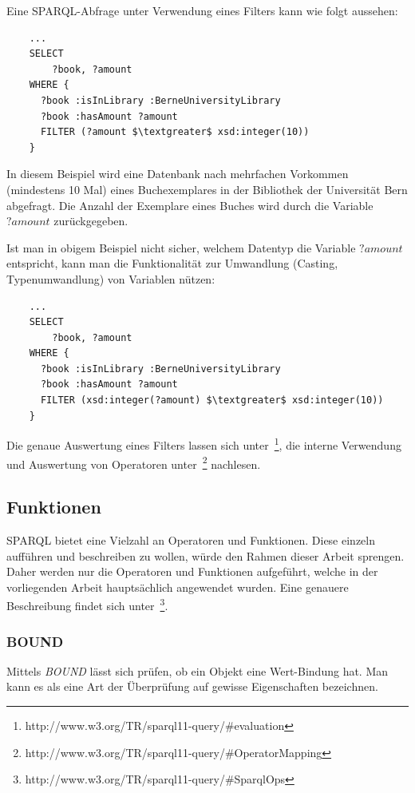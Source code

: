Eine SPARQL-Abfrage unter Verwendung eines Filters kann wie folgt aussehen:
\begin{lstlisting}
    ...
    SELECT
        ?book, ?amount
    WHERE {
      ?book :isInLibrary :BerneUniversityLibrary
      ?book :hasAmount ?amount
      FILTER (?amount $\textgreater$ xsd:integer(10))
    }
\end{lstlisting}
In diesem Beispiel wird eine Datenbank nach mehrfachen Vorkommen (mindestens 10 Mal) eines Buchexemplares in der Bibliothek der Universität Bern abgefragt. Die Anzahl der Exemplare eines Buches wird durch die Variable $?amount$ zurückgegeben.

Ist man in obigem Beispiel nicht sicher, welchem Datentyp die Variable $?amount$ entspricht, kann man die Funktionalität zur Umwandlung (Casting, Typenumwandlung) von Variablen nützen:
\begin{lstlisting}
    ...
    SELECT
        ?book, ?amount
    WHERE {
      ?book :isInLibrary :BerneUniversityLibrary
      ?book :hasAmount ?amount
      FILTER (xsd:integer(?amount) $\textgreater$ xsd:integer(10))
    }
\end{lstlisting}

Die genaue Auswertung eines Filters lassen sich unter~\footnote{http://www.w3.org/TR/sparql11-query/\#evaluation}, die interne Verwendung und Auswertung von Operatoren unter~\footnote{http://www.w3.org/TR/sparql11-query/\#OperatorMapping} nachlesen.

\subsection{Funktionen}
\label{subsec:sparql_ausdruecke_funktionen}

SPARQL bietet eine Vielzahl an Operatoren und Funktionen. Diese einzeln aufführen und beschreiben zu wollen, würde den Rahmen dieser Arbeit sprengen. Daher werden nur die Operatoren und Funktionen aufgeführt, welche in der vorliegenden Arbeit hauptsächlich angewendet wurden. Eine genauere Beschreibung findet sich unter~\footnote{http://www.w3.org/TR/sparql11-query/\#SparqlOps}.

\subsubsection{BOUND}
\label{subsec:sparql_ausdruecke_funktionen_bound}
Mittels \textit{BOUND} lässt sich prüfen, ob ein Objekt eine Wert-Bindung hat. Man kann es als eine Art der Überprüfung auf gewisse Eigenschaften bezeichnen.

